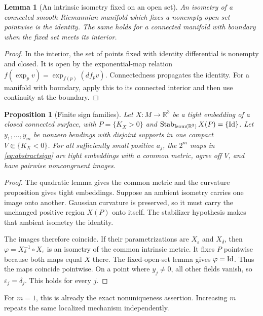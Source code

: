 \documentclass[11pt]{amsart}
\newtheorem{proposition}[theorem]{Proposition}
\newtheorem{lemma}[theorem]{Lemma}
\theoremstyle{definition}
\theoremstyle{remark}
\newcommand{\R}{\mathbb R}\newcommand{\Sph}{\mathbb S}
\DeclareMathOperator{\Isom}{Isom}\DeclareMathOperator{\Emb}{Emb}
\numberwithin{equation}{section}
\begin{document}
\begin{lemma}[An intrinsic isometry fixed on an open set]\label{lem:fixed-open}
An isometry of a connected smooth Riemannian manifold which fixes a
nonempty open set pointwise is the identity. The same holds for a connected
manifold with boundary when the fixed set meets its interior.
\end{lemma}
\begin{proof}
In the interior, the set of points fixed with identity differential is
nonempty and closed. It is open by the exponential-map relation
$f(\exp_pv)=\exp_{f(p)}(df_pv)$. Connectedness propagates the identity.
For a manifold with boundary, apply this to its connected interior and
then use continuity at the boundary.
\end{proof}

\begin{proposition}[Finite sign families]\label{prop:finite-sign}
Let $X:M\to\R^3$ be a tight embedding of a closed connected surface,
with $P=\{K_X>0\}$ and $\Stab_{\Isom(\R^3)}X(P)=\{\Id\}$.
Let $y_1,\ldots,y_m$ be nonzero bendings with disjoint supports in one
compact $V\Subset\{K_X<0\}$. For all sufficiently small positive
$a_j$, the $2^m$ maps in \eqref{eq:abstractsign} are tight embeddings
with a common metric, agree off $V$, and have pairwise noncongruent images.
\end{proposition}
\begin{proof}
The quadratic lemma gives the common metric and the curvature proposition
gives tight embeddings. Suppose an ambient isometry carries one image
onto another. Gaussian curvature is preserved, so it must carry the
unchanged positive region $X(P)$ onto itself. The stabilizer hypothesis
makes that ambient isometry the identity.

The images therefore coincide. If their parametrizations are $X_\varepsilon$
and $X_\delta$, then $\varphi=X_\delta^{-1}\circ X_\varepsilon$ is an
isometry of the common intrinsic metric. It fixes $P$ pointwise because
both maps equal $X$ there. The fixed-open-set lemma gives $\varphi=\mathrm{Id}$.
Thus the maps coincide pointwise. On a point where $y_j\ne0$, all other
fields vanish, so $\varepsilon_j=\delta_j$. This holds for every $j$.
\end{proof}
For $m=1$, this is already the exact nonuniqueness assertion. Increasing
$m$ repeats the same localized mechanism independently.
\end{document}
